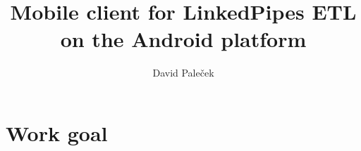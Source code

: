 \documentclass[thesis=B,english]{FITthesis}[2019/12/23]
\title{Mobile client for LinkedPipes ETL on the Android platform}
\author{David Paleček} %
\begin{document}

\begin{introduction}
	
\end{introduction}

%
%
%
%
%
%
%
%
%
%
%
%
%

\chapter*{Work goal}


%
\end{document}

